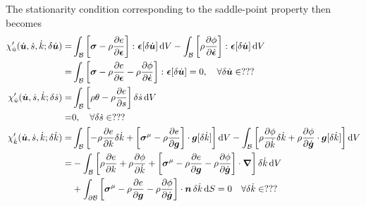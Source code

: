 The stationarity condition corresponding to the saddle-point property then becomes
\begin{subequations}\label{eq:8-302}
    \begin{align}
    \chi'_{\dot{u}}(\dot{\bm{u}},\dot{s},\dot{k};\delta\dot{\bm{u}})
    =&
    \int_{\mathcal{B}} \left[\bm{\sigma} - \rho\frac{\partial e}{\partial \bm{\epsilon}}\right] \colon \bm{\epsilon}[\delta\dot{\bm{u}}] \mathop{}\!\mathrm{d} V -
     \int_{\mathcal{B}} \left[\rho\frac{\partial \phi}{\partial \dot{\bm{\epsilon}}}\right] \colon \bm{\epsilon}[\delta\dot{\bm{u}}] \mathop{}\!\mathrm{d} V
    \nonumber \\
    =&
    \int_{\mathcal{B}} \left[\bm{\sigma} - \rho\frac{\partial e}{\partial \bm{\epsilon}} -  \rho\frac{\partial \phi}{\partial \dot{\bm{\epsilon}}} \right] \colon \bm{\epsilon}[\delta\dot{\bm{u}}]  = 0,
    \quad \forall \delta\dot{\bm{u}}\in ???
\label{eq:8-302a}\\
    \chi'_{\dot{u}}(\dot{\bm{u}},\dot{s},\dot{k};\delta\dot{s})
    =&
    \int_{\mathcal{B}} \left[\rho\theta - \rho\frac{\partial e}{\partial s}\right] \delta\dot{s} \mathop{}\!\mathrm{d} V
    \nonumber \\
    =&
    0,
    \quad \forall \delta\dot{s}\in ???
\label{eq:8-302b}\\
    \chi'_{\dot{k}}(\dot{\bm{u}},\dot{s},\dot{k};\delta\dot{k})
    =&
    \int_{\mathcal{B}} \left[-\rho\frac{\partial e}{\partial k} \delta\dot{k} + \left[\bm{\sigma}^{\mathrm{\mu}} - \rho\frac{\partial e}{\partial \bm{g}}\right] \cdot \bm{g}[\delta\dot{k}]\right] \mathop{}\!\mathrm{d} V -
    \int_{\mathcal{B}} \left[\rho\frac{\partial \phi}{\partial \dot{k}} \delta\dot{k} + \rho\frac{\partial \phi}{\partial \dot{\bm{g}}} \cdot \bm{g}[\delta\dot{k}]\right] \mathop{}\!\mathrm{d} V
    \nonumber \\
    =&
     -\int_{\mathcal{B}} \left[\rho\frac{\partial e}{\partial k} + \rho\frac{\partial \phi}{\partial \dot{k}} +
     \left[\bm{\sigma}^{\mathrm{\mu}} - \rho\frac{\partial e}{\partial \bm{g}} - \rho\frac{\partial \phi}{\partial \dot{\bm{g}}}\right] \cdot \bm{\nabla}\right]\delta\dot{k} \mathop{}\!\mathrm{d} V
    \nonumber \\
     &+ \int_{\partial\mathcal{B}} \left[\bm{\sigma}^{\mathrm{\mu}} - \rho\frac{\partial e}{\partial \bm{g}} - \rho\frac{\partial \phi}{\partial \dot{\bm{g}}}\right] \cdot \bm{n}\, \delta\dot{k}\mathop{}\!\mathrm{d} S = 0
    \quad \forall \delta\dot{k}\in ???
\label{eq:8-302c}
    \end{align}
\end{subequations}
